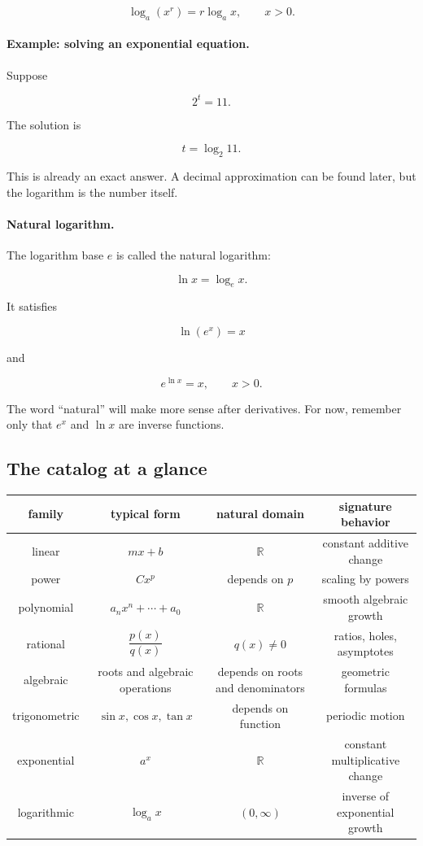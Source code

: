 \[
\log_a(x^r)=r\log_a x,
\qquad x>0.
\]

\paragraph{Example: solving an exponential equation.}
Suppose

\[
2^t=11.
\]

The solution is

\[
t=\log_2 11.
\]

This is already an exact answer. A decimal approximation can be found later, but the logarithm is the number itself.

\paragraph{Natural logarithm.}
The logarithm base \(e\) is called the natural logarithm:

\[
\ln x=\log_e x.
\]

It satisfies

\[
\ln(e^x)=x
\]

and

\[
e^{\ln x}=x,
\qquad x>0.
\]

The word ``natural'' will make more sense after derivatives. For now, remember only that \(e^x\) and \(\ln x\) are inverse functions.

\subsection{The catalog at a glance}
\label{subsec:catalog-glance}

\begin{center}
\renewcommand{\arraystretch}{1.4}
\begin{tabular}{c|c|c|c}
\textbf{family} & \textbf{typical form} & \textbf{natural domain} & \textbf{signature behavior} \\ \hline
linear & \(mx+b\) & \(\mathbb R\) & constant additive change \\
power & \(Cx^p\) & depends on \(p\) & scaling by powers \\
polynomial & \(a_nx^n+\cdots+a_0\) & \(\mathbb R\) & smooth algebraic growth \\
rational & \(\dfrac{p(x)}{q(x)}\) & \(q(x)\neq0\) & ratios, holes, asymptotes \\
algebraic & roots and algebraic operations & depends on roots and denominators & geometric formulas \\
trigonometric & \(\sin x,\cos x,\tan x\) & depends on function & periodic motion \\
exponential & \(a^x\) & \(\mathbb R\) & constant multiplicative change \\
logarithmic & \(\log_a x\) & \((0,\infty)\) & inverse of exponential growth
\end{tabular}
\end{center}

